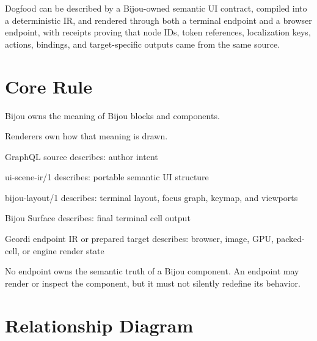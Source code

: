 Dogfood can be described by a Bijou-owned semantic UI contract, compiled into a deterministic IR, and rendered through both a terminal endpoint and a browser endpoint, with receipts proving that node IDs, token references, localization keys, actions, bindings, and target-specific outputs came from the same source.

\section{Core Rule}\label{record-139-core-rule}

Bijou owns the meaning of Bijou blocks and components.

Renderers own how that meaning is drawn.

\begin{CodeBlock}
GraphQL source
  describes: author intent

ui-scene-ir/1
  describes: portable semantic UI structure

bijou-layout/1
  describes: terminal layout, focus graph, keymap, and viewports

Bijou Surface
  describes: final terminal cell output

Geordi endpoint IR or prepared target
  describes: browser, image, GPU, packed-cell, or engine render state
\end{CodeBlock}

No endpoint owns the semantic truth of a Bijou component. An endpoint may render or inspect the component, but it must not silently redefine its behavior.

\section{Relationship Diagram}\label{record-139-relationship-diagram}


